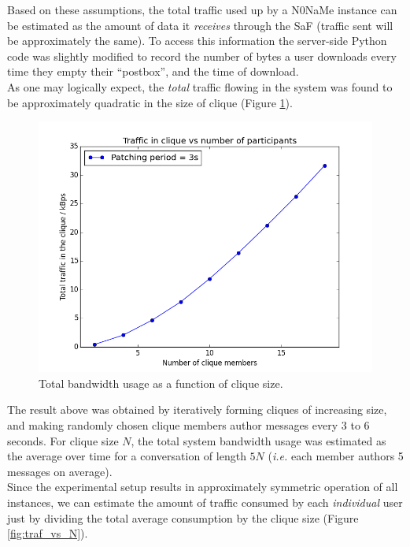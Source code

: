 \documentclass[a4paper, 12pt]{report}
\newcommand{\funkytt}{\fontfamily{AnonymousPro}\selectfont}
\begin{document}
Based on these assumptions, the total traffic used up by a {\funkytt N0NaMe} instance can be estimated as the amount of data it \emph{receives} through the SaF (traffic sent will be approximately the same). To access this information the server-side Python code was slightly modified to record the number of bytes a user downloads every time they empty their ``postbox'', and the time of download. \\

As one may logically expect, the \emph{total} traffic flowing in the system was found to be approximately quadratic in the size of clique (Figure \ref{fig:alltraf}).

\begin{figure}[H]
    \captionsetup{width=0.9\textwidth}
    \centering
    \includegraphics[width=0.70\linewidth]{pics/eval/alltraf_vs_N.png}
    \caption{\label{fig:alltraf} Total bandwidth usage as a function of clique size.}
\end{figure}
The result above was obtained by iteratively forming cliques of increasing size, and making randomly chosen clique members author messages every 3 to 6 seconds. For clique size $N$, the total system bandwidth usage was estimated as the average over time for a conversation of length $5N$ (\textit{i.e.} each member authors 5 messages on average). \\

Since the experimental setup results in approximately symmetric operation of all instances, we can estimate the amount of traffic consumed by each \emph{individual} user just by dividing the total average consumption by the clique size (Figure \ref{fig:traf_vs_N}).
\end{document}
